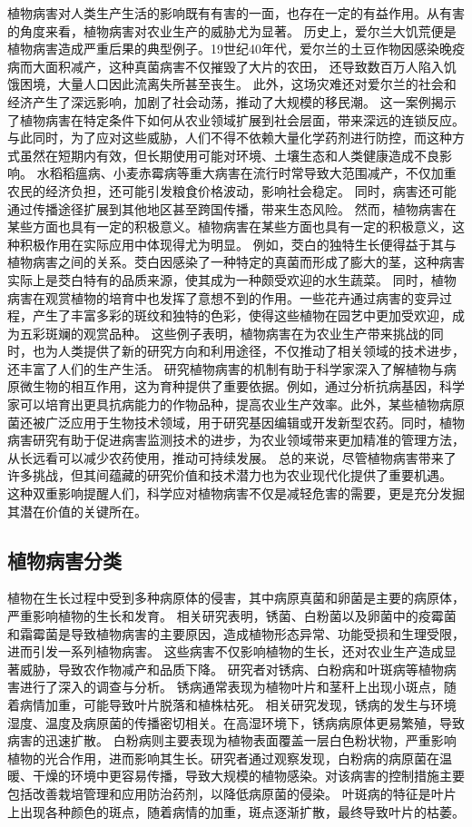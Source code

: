 \documentclass[AutoFakeBold]{LZUThesis-PgD&PhD}
\begin{document}
	
	植物病害对人类生产生活的影响既有有害的一面，也存在一定的有益作用。从有害的角度来看，植物病害对农业生产的威胁尤为显著。
	历史上，爱尔兰大饥荒便是植物病害造成严重后果的典型例子。19世纪40年代，爱尔兰的土豆作物因感染晚疫病而大面积减产，这种真菌病害不仅摧毁了大片的农田，
	还导致数百万人陷入饥饿困境，大量人口因此流离失所甚至丧生。
	此外，这场灾难还对爱尔兰的社会和经济产生了深远影响，加剧了社会动荡，推动了大规模的移民潮。
	这一案例揭示了植物病害在特定条件下如何从农业领域扩展到社会层面，带来深远的连锁反应。
	与此同时，为了应对这些威胁，人们不得不依赖大量化学药剂进行防控，而这种方式虽然在短期内有效，但长期使用可能对环境、土壤生态和人类健康造成不良影响。
	水稻稻瘟病、小麦赤霉病等重大病害在流行时常导致大范围减产，不仅加重农民的经济负担，还可能引发粮食价格波动，影响社会稳定。
	同时，病害还可能通过传播途径扩展到其他地区甚至跨国传播，带来生态风险。
	然而，植物病害在某些方面也具有一定的积极意义。植物病害在某些方面也具有一定的积极意义，这种积极作用在实际应用中体现得尤为明显。
	例如，茭白的独特生长便得益于其与植物病害之间的关系。茭白因感染了一种特定的真菌而形成了膨大的茎，这种病害实际上是茭白特有的品质来源，使其成为一种颇受欢迎的水生蔬菜。
	同时，植物病害在观赏植物的培育中也发挥了意想不到的作用。一些花卉通过病害的变异过程，产生了丰富多彩的斑纹和独特的色彩，使得这些植物在园艺中更加受欢迎，成为五彩斑斓的观赏品种。
	这些例子表明，植物病害在为农业生产带来挑战的同时，也为人类提供了新的研究方向和利用途径，不仅推动了相关领域的技术进步，还丰富了人们的生产生活。
	研究植物病害的机制有助于科学家深入了解植物与病原微生物的相互作用，这为育种提供了重要依据。例如，通过分析抗病基因，科学家可以培育出更具抗病能力的作物品种，提高农业生产效率。此外，某些植物病原菌还被广泛应用于生物技术领域，用于研究基因编辑或开发新型农药。同时，植物病害研究有助于促进病害监测技术的进步，为农业领域带来更加精准的管理方法，从长远看可以减少农药使用，推动可持续发展。
	总的来说，尽管植物病害带来了许多挑战，但其间蕴藏的研究价值和技术潜力也为农业现代化提供了重要机遇。
	这种双重影响提醒人们，科学应对植物病害不仅是减轻危害的需要，更是充分发掘其潜在价值的关键所在。
	
	
	
	\subsection{植物病害分类}
	
	植物在生长过程中受到多种病原体的侵害，其中病原真菌和卵菌是主要的病原体，严重影响植物的生长和发育。
	相关研究表明，锈菌、白粉菌以及卵菌中的疫霉菌和霜霉菌是导致植物病害的主要原因，造成植物形态异常、功能受损和生理受限，进而引发一系列植物病害。
	这些病害不仅影响植物的生长，还对农业生产造成显著威胁，导致农作物减产和品质下降。
	研究者对锈病、白粉病和叶斑病等植物病害进行了深入的调查与分析。
	锈病通常表现为植物叶片和茎秆上出现小斑点，随着病情加重，可能导致叶片脱落和植株枯死。
	相关研究发现，锈病的发生与环境湿度、温度及病原菌的传播密切相关。在高湿环境下，锈病病原体更易繁殖，导致病害的迅速扩散。
	白粉病则主要表现为植物表面覆盖一层白色粉状物，严重影响植物的光合作用，进而影响其生长。研究者通过观察发现，白粉病的病原菌在温暖、干燥的环境中更容易传播，导致大规模的植物感染。对该病害的控制措施主要包括改善栽培管理和应用防治药剂，以降低病原菌的侵染。
	叶斑病的特征是叶片上出现各种颜色的斑点，随着病情的加重，斑点逐渐扩散，最终导致叶片的枯萎。
	
\end{document}
